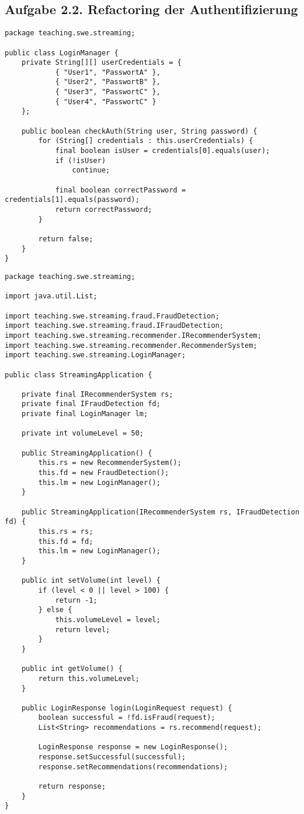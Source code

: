 \subsection*{Aufgabe 2.2. Refactoring der Authentifizierung}

\begin{lstlisting}[style=javastyle]
package teaching.swe.streaming;

public class LoginManager {
    private String[][] userCredentials = {
            { "User1", "PasswortA" },
            { "User2", "PasswortB" },
            { "User3", "PasswortC" },
            { "User4", "PasswortC" }
    };

    public boolean checkAuth(String user, String password) {
        for (String[] credentials : this.userCredentials) {
            final boolean isUser = credentials[0].equals(user);
            if (!isUser)
                continue;

            final boolean correctPassword = credentials[1].equals(password);
            return correctPassword;
        }

        return false;
    }
}
\end{lstlisting}
\begin{lstlisting}[style=javastyle]
package teaching.swe.streaming;

import java.util.List;

import teaching.swe.streaming.fraud.FraudDetection;
import teaching.swe.streaming.fraud.IFraudDetection;
import teaching.swe.streaming.recommender.IRecommenderSystem;
import teaching.swe.streaming.recommender.RecommenderSystem;
import teaching.swe.streaming.LoginManager;

public class StreamingApplication {

    private final IRecommenderSystem rs;
    private final IFraudDetection fd;
    private final LoginManager lm;

    private int volumeLevel = 50;

    public StreamingApplication() {
        this.rs = new RecommenderSystem();
        this.fd = new FraudDetection();
        this.lm = new LoginManager();
    }

    public StreamingApplication(IRecommenderSystem rs, IFraudDetection fd) {
        this.rs = rs;
        this.fd = fd;
        this.lm = new LoginManager();
    }

    public int setVolume(int level) {
        if (level < 0 || level > 100) {
            return -1;
        } else {
            this.volumeLevel = level;
            return level;
        }
    }

    public int getVolume() {
        return this.volumeLevel;
    }

    public LoginResponse login(LoginRequest request) {
        boolean successful = !fd.isFraud(request);
        List<String> recommendations = rs.recommend(request);

        LoginResponse response = new LoginResponse();
        response.setSuccessful(successful);
        response.setRecommendations(recommendations);

        return response;
    }
}

\end{lstlisting}

